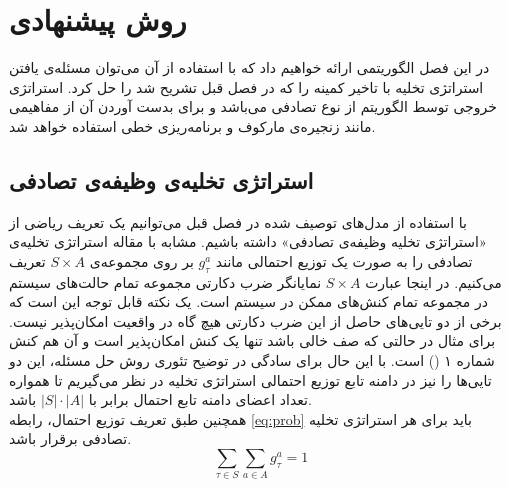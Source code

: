 \chapter{روش پیشنهادی}
در این فصل الگوریتمی ارائه خواهیم داد که با استفاده از آن می‌توان مسئله‌ی یافتن استراتژی تخلیه با تاخیر کمینه را که در فصل قبل تشریح شد را حل کرد. استراتژی خروجی توسط الگوریتم از نوع تصادفی می‌باشد و برای بدست آوردن آن از مفاهیمی مانند زنجیره‌ی مارکوف و برنامه‌ریزی خطی استفاده خواهد شد.

\section{استراتژی تخلیه‌ی وظیفه‌ی تصادفی}
با استفاده از مدل‌های توصیف شده در فصل قبل می‌توانیم یک تعریف ریاضی از «استراتژی تخلیه وظیفه‌ی تصادفی» داشته باشیم. مشابه با مقاله \cite{Liu} استراتژی تخلیه‌ی تصادفی را به صورت یک توزیع احتمالی مانند \(g_\tau^a\) بر روی مجموعه‌ی \(S \times A\) تعریف می‌کنیم. در اینجا عبارت \(S \times A\) نمایانگر ضرب دکارتی مجموعه تمام حالت‌های سیستم در مجموعه تمام کنش‌های ممکن در سیستم است. یک نکته قابل توجه این است که برخی از دو تایی‌های حاصل از این ضرب دکارتی هیچ گاه در واقعیت امکان‌پذیر نیست. برای مثال در حالتی که صف خالی باشد تنها یک کنش امکان‌پذیر است و آن هم کنش شماره ۱ () است. با این حال برای سادگی در توضیح تئوری روش حل مسئله، این دو تایی‌ها را نیز در دامنه تابع توزیع احتمالی استراتژی تخلیه در نظر می‌گیریم تا همواره تعداد اعضای دامنه تابع احتمال برابر با \(|S| \cdot |A|\) باشد. \\

همچنین طبق تعریف توزیع احتمال، رابطه \ref{eq:prob} باید برای هر استراتژی تخلیه تصادفی برقرار باشد.
\begin{equation}
	\label{eq:prob}
	\sum_{\tau \in S} \sum_{a \in A} g_{\tau}^{a}=1
\end{equation}
